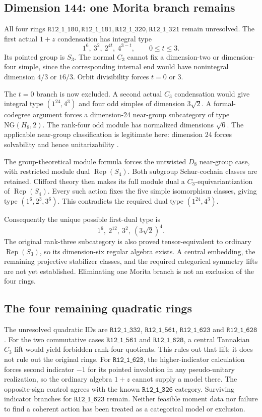 \documentclass[11pt]{article}
\newcommand{\R}[1]{\texttt{R12\_1\_#1}}
\newcommand{\Rep}{\operatorname{Rep}}
\begin{document}
\subsection{Dimension 144: one Morita branch remains}
All four rings $\R{180},\R{181},\R{320},\R{321}$ remain unresolved.
The first actual $1+z$ condensation has integral type
\[
1^6,\ 3^2,\ 2^{4t},\ 4^{3-t},\qquad 0\leq t\leq3.
\]
Its pointed group is $S_3$. The normal $C_3$ cannot fix a dimension-two
or dimension-four simple, since the corresponding internal end would
have nonintegral dimension $4/3$ or $16/3$. Orbit divisibility forces
$t=0$ or $3$.

The $t=0$ branch is now excluded. A second actual $C_3$ condensation
would give integral type $(1^{24},4^3)$ and four odd simples of dimension
$3\sqrt2$. A formal-codegree argument forces a dimension-24 near-group
subcategory of type $\mathrm{NG}(H_8,2)$. The rank-four odd module has
normalized dimensions $\sqrt6$. The applicable near-group classification
is legitimate here: dimension 24 forces solvability and hence
unitarizability \cite{ENO,GHR,IT}.

The group-theoretical module formula forces the untwisted $D_8$
near-group case, with restricted module dual $\Rep(S_4)$. Both subgroup
Schur-cochain classes are retained. Clifford theory \cite{Gal} then
makes its full module dual a $C_3$-equivariantization of $\Rep(S_4)$.
Every such action fixes the five simple isomorphism classes, giving type
$(1^6,2^3,3^6)$. This contradicts the required dual type $(1^{24},4^3)$.

Consequently the unique possible first-dual type is
\[
1^6,\ 2^{12},\ 3^2,\ (3\sqrt2)^4.
\]
The original rank-three subcategory is also proved tensor-equivalent to
ordinary $\Rep(S_3)$, so its dimension-six regular algebra exists.
A central embedding, the remaining projective stabilizer classes, and
the required categorical symmetry lifts are not yet established.
Eliminating one Morita branch is not an exclusion of the four rings.

\subsection{The four remaining quadratic rings}
The unresolved quadratic IDs are $\R{332}$, $\R{561}$, $\R{623}$ and
$\R{628}$. For the two commutative cases $\R{561}$ and $\R{628}$, a
central Tannakian $C_3$ lift would yield forbidden rank-four quotients.
This rules out that lift; it does not rule out the original rings.
For $\R{623}$, the higher-indicator calculation forces second indicator
$-1$ for its pointed involution in any pseudo-unitary realization, so the
ordinary algebra $1+z$ cannot supply a model there. The opposite-sign
control agrees with the known $\R{326}$ category. Surviving indicator
branches for $\R{623}$ remain.
Neither feasible moment data nor failure to find a coherent action has
been treated as a categorical model or exclusion.
\end{document}
